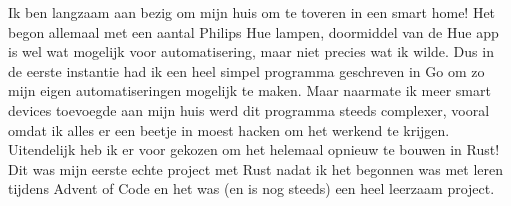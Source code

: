 \documentclass[9pt]{developercv} %
\begin{document}
\begin{minipage}[t]{0.3\textwidth}
	\vspace{-\baselineskip} %

	Ik ben langzaam aan bezig om mijn huis om te toveren in een smart home!
	Het begon allemaal met een aantal Philips Hue lampen, doormiddel van de Hue app is wel wat mogelijk voor automatisering, maar niet precies wat ik wilde.
	Dus in de eerste instantie had ik een heel simpel programma geschreven in Go om zo mijn eigen automatiseringen mogelijk te maken.
	Maar naarmate ik meer smart devices toevoegde aan mijn huis werd dit programma steeds complexer, vooral omdat ik alles er een beetje in moest hacken om het werkend te krijgen.
	Uitendelijk heb ik er voor gekozen om het helemaal opnieuw te bouwen in Rust!
	Dit was mijn eerste echte project met Rust nadat ik het begonnen was met leren tijdens Advent of Code en het was (en is nog steeds) een heel leerzaam project.

	\vspace{3pt}

\end{minipage}
\hfill
\begin{minipage}[t]{0.3\textwidth}
\end{minipage}

\end{document}
